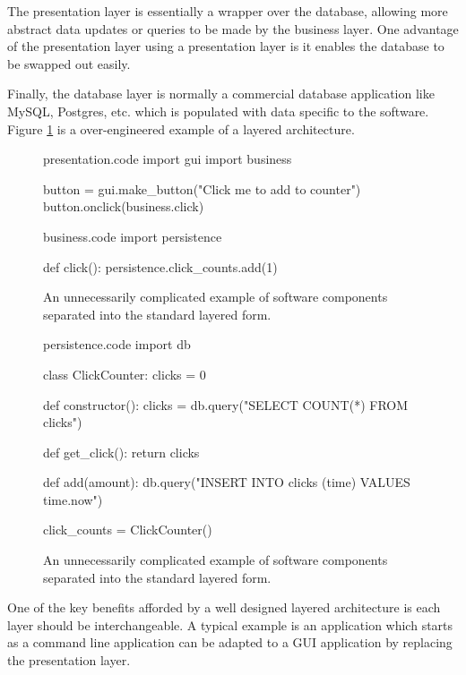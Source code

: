 The presentation layer is essentially a wrapper over the database, allowing more abstract data updates or queries to be made by the business layer.
One advantage of the presentation layer using a presentation layer is it enables the database to be swapped out easily.

Finally, the database layer is normally a commercial database application like MySQL, Postgres, etc. which is populated with data specific to the software.
Figure \ref{fig:standard-form-example} is a over-engineered example of a layered architecture.

\begin{figure}[H]
\begin{code}[style=python]{presentation.code}
import gui
import business

button = gui.make_button("Click me to add to counter")
button.onclick(business.click)
\end{code}

\begin{code}[style=python]{business.code}
import persistence

def click():
    persistence.click_counts.add(1)
\end{code}
\caption{An unnecessarily complicated example of software components separated into the standard layered form.}
\label{fig:standard-form-example}
\end{figure}

\begin{figure}[H]
\ContinuedFloat
\begin{code}[style=python]{persistence.code}
import db

class ClickCounter:
    clicks = 0

    def constructor():
        clicks = db.query("SELECT COUNT(*) FROM clicks")

    def get_click():
        return clicks

    def add(amount):
        db.query("INSERT INTO clicks (time) VALUES {{time.now}}")

click_counts = ClickCounter()
\end{code}
\caption{An unnecessarily complicated example of software components separated into the standard layered form.}
\end{figure}

One of the key benefits afforded by a well designed layered architecture is each layer should be interchangeable.
A typical example is an application which starts as a command line application can be adapted to a GUI application by replacing the presentation layer.

